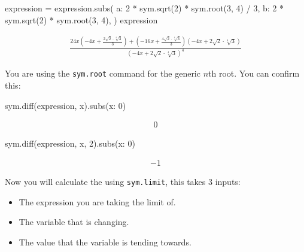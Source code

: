 \begin{pyin}
expression = expression.subs(
    {
        a: 2 * sym.sqrt(2) * sym.root(3, 4) / 3, 
        b: 2 * sym.sqrt(2) * sym.root(3, 4),
    }
)
expression
\end{pyin}




\begin{equation*}
\begin{split}\displaystyle \frac{24 x \left(- 4 x + \frac{2 \sqrt{2} \cdot \sqrt[4]{3}}{3}\right) + \left(- 16 x + \frac{4 \sqrt{2} \cdot \sqrt[4]{3}}{3}\right) \left(- 4 x + 2 \sqrt{2} \cdot \sqrt[4]{3}\right)}{\left(- 4 x + 2 \sqrt{2} \cdot \sqrt[4]{3}\right)^{4}}\end{split}
\end{equation*}

You are using the \texttt{sym.root} command for the generic \(n\)th root.
You can confirm this:




\begin{pyin}
sym.diff(expression, x).subs({x: 0})
\end{pyin}




\begin{equation*}
\begin{split}\displaystyle 0\end{split}
\end{equation*}






\begin{pyin}
sym.diff(expression, x, 2).subs({x: 0})
\end{pyin}




\begin{equation*}
\begin{split}\displaystyle -1\end{split}
\end{equation*}




Now you will calculate the  using \texttt{sym.limit}, this takes 3 inputs:
\begin{itemize}
\item 

The expression you are taking the limit of.

\item 

The variable that is changing.

\item 

The value that the variable is tending towards.

\end{itemize}




